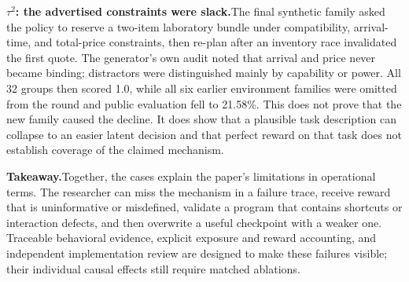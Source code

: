 \textbf{$\tau^2$: the advertised constraints were slack.}\quad The final synthetic family asked the policy to reserve a two-item laboratory bundle under compatibility, arrival-time, and total-price constraints, then re-plan after an inventory race invalidated the first quote. The generator's own audit noted that arrival and price never became binding; distractors were distinguished mainly by capability or power. All 32 groups then scored 1.0, while all six earlier environment families were omitted from the round and public evaluation fell to 21.58\%. This does not prove that the new family caused the decline. It does show that a plausible task description can collapse to an easier latent decision and that perfect reward on that task does not establish coverage of the claimed mechanism.

\textbf{Takeaway.}\quad Together, the cases explain the paper's limitations in operational terms. The researcher can miss the mechanism in a failure trace, receive reward that is uninformative or misdefined, validate a program that contains shortcuts or interaction defects, and then overwrite a useful checkpoint with a weaker one. Traceable behavioral evidence, explicit exposure and reward accounting, and independent implementation review are designed to make these failures visible; their individual causal effects still require matched ablations.

\endgroup
